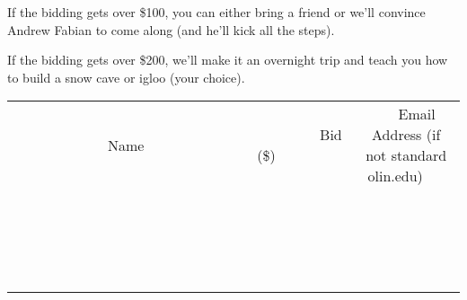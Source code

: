 \documentclass[11pt]{article}
\begin{document}
If the bidding gets over \$100, you can either bring a friend or we'll convince Andrew Fabian to come along (and he'll kick all the steps).

If the bidding gets over \$200, we'll make it an overnight trip and teach you how to build a snow cave or igloo (your choice).
\\[3ex]
\begin{tabular}{c c c}
~~~~~~~~~~~~~Name~~~~~~~~~~~~~ & ~~~~~~~~~Bid (\$)~~~~~~~~~  & ~~~Email Address (if not standard olin.edu)~~~\\
 & & \\
\hline
 & & \\
\hline
 & & \\
\hline
 & & \\
\hline
 & & \\
\hline
 & & \\
\hline
 & & \\
\hline
 & & \\
\hline
 & & \\
\hline
 & & \\
\hline
 & & \\
\hline
 & & \\
\hline
 & & \\
\hline
 & & \\
\hline
 & & \\
\hline
 & & \\
\hline
 & & \\
\hline
 & & \\
\hline
 & & \\
\hline
\end{tabular}
\newpage
\end{document}
